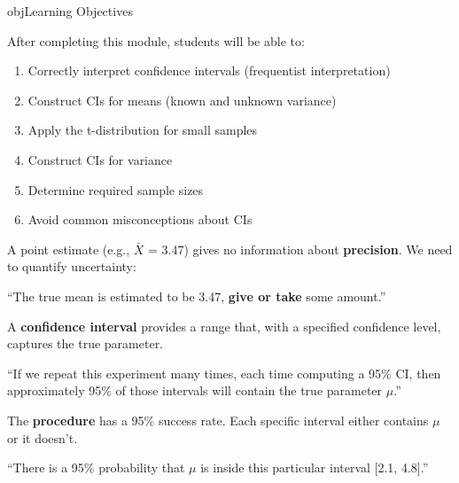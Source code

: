 \begin{PSbox}[unbreakable]{obj}{Learning Objectives}

After completing this module, students will be able to:

\begin{enumerate}
\def\labelenumi{\arabic{enumi}.}
\tightlist
\item
  Correctly interpret confidence intervals (frequentist interpretation)
\item
  Construct CIs for means (known and unknown variance)
\item
  Apply the t-distribution for small samples
\item
  Construct CIs for variance
\item
  Determine required sample sizes
\item
  Avoid common misconceptions about CIs
\end{enumerate}

\end{PSbox}


A point estimate (e.g., \ensuremath{\bar{X}} = 3.47) gives no information about \textbf{precision}. We need to quantify uncertainty:

``The true mean is estimated to be 3.47, \textbf{give or take} some amount.''

A \textbf{confidence interval} provides a range that, with a specified confidence level, captures the true parameter.



\begin{PSquote}

``If we repeat this experiment many times, each time computing a 95\% CI, then approximately 95\% of those intervals will contain the true parameter \ensuremath{\mu}.''

\end{PSquote}

The \textbf{procedure} has a 95\% success rate. Each specific interval either contains \ensuremath{\mu} or it doesn’t.


\begin{PSquote}

{``There is a 95\% probability that \ensuremath{\mu} is inside this particular interval [2.1, 4.8].''}

\end{PSquote}

